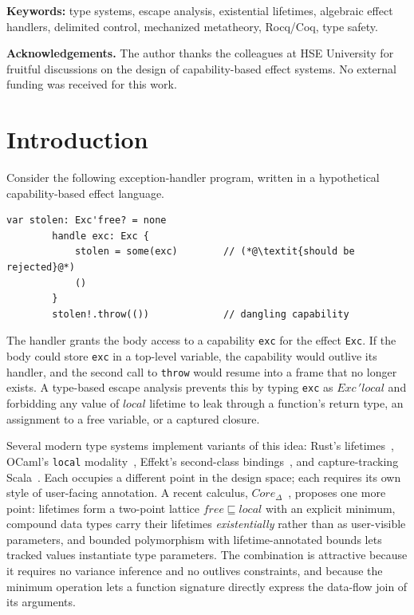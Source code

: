 \documentclass[12pt,a4paper]{article}
\begin{document}
    \vspace{0.4em}
    \noindent\textbf{Keywords:}
    type systems, escape analysis, existential lifetimes, algebraic effect handlers,
    delimited control, mechanized metatheory, Rocq/Coq, type safety.

    \vspace{0.4em}
    \noindent\textbf{Acknowledgements.}
    The author thanks the colleagues at HSE University for fruitful discussions on the design of
    capability-based effect systems.
    No external funding was received for this work.


    \section{Introduction}

    Consider the following exception-handler program, written in a hypothetical
    capability-based effect language.
    \begin{lstlisting}[language=colang]
        var stolen: Exc'free? = none
        handle exc: Exc {
            stolen = some(exc)        // (*@\textit{should be rejected}@*)
            ()
        }
        stolen!.throw(())             // dangling capability
    \end{lstlisting}
    The handler grants the body access to a capability \texttt{exc} for the effect
    \texttt{Exc}.
    If the body could store \texttt{exc} in a top-level variable, the capability would
    outlive its handler, and the second call to \texttt{throw} would resume into a frame
    that no longer exists.
    A type-based escape analysis prevents this by typing \texttt{exc} as
    $\mathit{Exc}\,'\!local$ and forbidding any value of $local$ lifetime to leak through
    a function's return type, an assignment to a free variable, or a captured closure.

    Several modern type systems implement variants of this idea:
    Rust's lifetimes~\cite{matsakis2014rust}, OCaml's \texttt{local}
    modality~\cite{lorenzen2024oxidizing}, Effekt's second-class
    bindings~\cite{brachthauser2020effects, brachthauser2022effects}, and
    capture-tracking Scala~\cite{boruch2023capturing}.
    Each occupies a different point in the design space; each requires its own
    style of user-facing annotation.
    A recent calculus, $Core_\Delta$~\cite{stoyan2025existential}, proposes one more
    point: lifetimes form a two-point lattice $free \sqsubseteq local$ with an
    explicit minimum, compound data types carry their lifetimes \emph{existentially}
    rather than as user-visible parameters, and bounded polymorphism with
    lifetime-annotated bounds lets tracked values instantiate type parameters.
    The combination is attractive because it requires no variance inference and
    no outlives constraints, and because the minimum operation lets a function
    signature directly express the data-flow join of its arguments.
\end{document}
